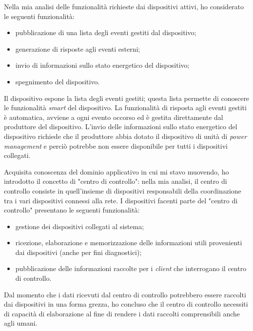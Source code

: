 Nella mia analisi delle funzionalità richieste dai dispositivi attivi, ho considerato le seguenti funzionalità:
\begin{itemize}
	\item pubblicazione di una lista degli eventi gestiti dal dispositivo;
	\item generazione di risposte agli eventi esterni;
	\item invio di informazioni sullo stato energetico del dispositivo;
	\item spegnimento del dispositivo.
\end{itemize}

Il dispositivo espone la lista degli eventi gestiti; questa lista permette di conoscere le funzionalità \emph{smart} del dispositivo.
La funzionalità di risposta agli eventi gestiti è automatica, avviene a ogni evento occorso ed è gestita direttamente dal produttore del dispositivo.
L'invio delle informazioni sullo stato energetico del dispositivo richiede che il produttore abbia dotato il dispositivo di unità di \emph{power management} e perciò potrebbe non essere disponibile per tutti i dispositivi collegati.

Acquisita conoscenza del dominio applicativo in cui mi stavo muovendo, ho introdotto il concetto di "centro di controllo": nella mia analisi, il centro di controllo consiste in quell'insieme di dispositivi responsabili della coordinazione tra i vari dispositivi connessi alla rete.
I dispositivi facenti parte del "centro di controllo" presentano le seguenti funzionalità:
\begin{itemize}
	\item gestione dei dispositivi collegati al sistema;
	\item ricezione, elaborazione e memorizzazione delle informazioni utili provenienti dai dispositivi (anche per fini diagnostici);
	\item pubblicazione delle informazioni raccolte per i \emph{client} che interrogano il centro di controllo.
\end{itemize}
Dal momento che i dati ricevuti dal centro di controllo potrebbero essere raccolti dai dispositivi in una forma grezza, ho concluso che il centro di controllo necessiti di capacità di elaborazione al fine di rendere i dati raccolti comprensibili anche agli umani.

